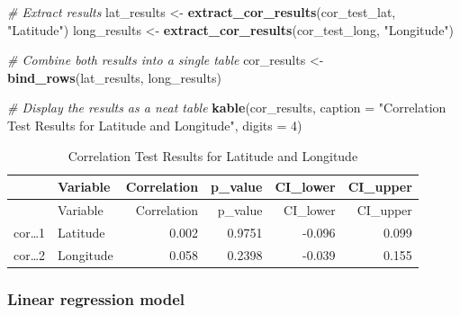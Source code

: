 \documentclass[
  11pt,
]{article}
\newenvironment{Shaded}{\begin{snugshade}}{\end{snugshade}}
\newcommand{\AttributeTok}[1]{\textcolor[rgb]{0.13,0.29,0.53}{#1}}
\newcommand{\CommentTok}[1]{\textcolor[rgb]{0.56,0.35,0.01}{\textit{#1}}}
\newcommand{\DecValTok}[1]{\textcolor[rgb]{0.00,0.00,0.81}{#1}}
\newcommand{\FunctionTok}[1]{\textcolor[rgb]{0.13,0.29,0.53}{\textbf{#1}}}
\newcommand{\NormalTok}[1]{#1}
\newcommand{\OtherTok}[1]{\textcolor[rgb]{0.56,0.35,0.01}{#1}}
\newcommand{\StringTok}[1]{\textcolor[rgb]{0.31,0.60,0.02}{#1}}
\begin{document}
\begin{Shaded}
\begin{Highlighting}[]
\CommentTok{\# Extract results}
\NormalTok{lat\_results }\OtherTok{\textless{}{-}} \FunctionTok{extract\_cor\_results}\NormalTok{(cor\_test\_lat, }\StringTok{"Latitude"}\NormalTok{)}
\NormalTok{long\_results }\OtherTok{\textless{}{-}} \FunctionTok{extract\_cor\_results}\NormalTok{(cor\_test\_long, }\StringTok{"Longitude"}\NormalTok{)}

\CommentTok{\# Combine both results into a single table}
\NormalTok{cor\_results }\OtherTok{\textless{}{-}} \FunctionTok{bind\_rows}\NormalTok{(lat\_results, long\_results)}

\CommentTok{\# Display the results as a neat table}
\FunctionTok{kable}\NormalTok{(cor\_results, }\AttributeTok{caption =} \StringTok{"Correlation Test Results for Latitude and Longitude"}\NormalTok{, }\AttributeTok{digits =} \DecValTok{4}\NormalTok{)}
\end{Highlighting}
\end{Shaded}

\begin{longtable}[]{@{}llrrrr@{}}
\caption{Correlation Test Results for Latitude and
Longitude}\tabularnewline
\toprule\noalign{}
& Variable & Correlation & p\_value & CI\_lower & CI\_upper \\
\midrule\noalign{}
\endfirsthead
\toprule\noalign{}
& Variable & Correlation & p\_value & CI\_lower & CI\_upper \\
\midrule\noalign{}
\endhead
\bottomrule\noalign{}
\endlastfoot
cor\ldots1 & Latitude & 0.002 & 0.9751 & -0.096 & 0.099 \\
cor\ldots2 & Longitude & 0.058 & 0.2398 & -0.039 & 0.155 \\
\end{longtable}

\subsubsection{\texorpdfstring{\textbf{Linear regression
model}}{Linear regression model}}\label{linear-regression-model}
\end{document}
